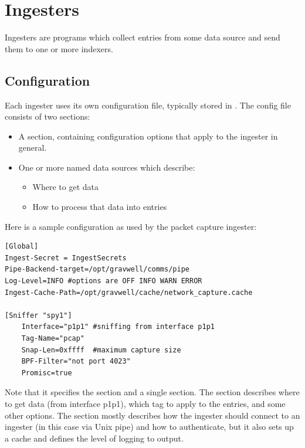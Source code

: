 \chapter{Ingesters}

Ingesters are programs which collect entries from some data source and
send them to one or more indexers.

\section{Configuration}
\label{sec:global-config}

Each ingester uses its own configuration file, typically stored in
. The config file consists of two sections:

\begin{itemize}
\item
  A \code{[Global]} section, containing configuration options that
  apply to the ingester in general.
\item
  One or more named data sources which describe:
	\begin{itemize}
	\item Where to get data
	\item How to process that data into entries
	\end{itemize}
\end{itemize}

Here is a sample configuration as used by the packet capture ingester:

\begin{Verbatim}[breaklines=true]
[Global]
Ingest-Secret = IngestSecrets
Pipe-Backend-target=/opt/gravwell/comms/pipe
Log-Level=INFO #options are OFF INFO WARN ERROR
Ingest-Cache-Path=/opt/gravwell/cache/network_capture.cache

[Sniffer "spy1"]
    Interface="p1p1" #sniffing from interface p1p1
    Tag-Name="pcap"
    Snap-Len=0xffff  #maximum capture size
    BPF-Filter="not port 4023"
    Promisc=true
\end{Verbatim}

Note that it specifies the \code{[Global]} section and a single
\code{[Sniffer]} section. The \code{[Sniffer]} section describes where to get
data (from interface p1p1), which tag to apply to the entries, and some
other options. The \code{[Global]} section mostly describes how the
ingester should connect to an ingester (in this case via Unix pipe) and
how to authenticate, but it also sets up a cache and defines the level
of logging to output.

